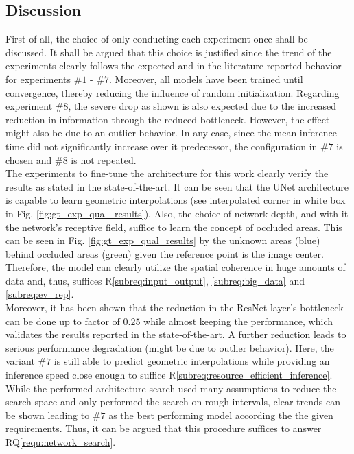 \subsection{Discussion}
\label{subsec:discussion_unet_arch}
First of all, the choice of only conducting each experiment once shall be discussed. It shall be argued that this choice is justified since the trend of the experiments clearly follows the expected and in the literature reported behavior for experiments $\#1$ - $\#7$. Moreover, all models have been trained until convergence, thereby reducing the influence of random initialization. Regarding experiment $\#8$, the severe drop as shown is also expected due to the increased reduction in information through the reduced bottleneck. However, the effect might also be due to an outlier behavior. In any case, since the mean inference time did not significantly increase over it predecessor, the configuration in $\#7$ is chosen and $\#8$ is not repeated.  
\\
The experiments to fine-tune the architecture for this work clearly verify the results as stated in the state-of-the-art. It can be seen that the UNet architecture is capable to learn geometric interpolations (see interpolated corner in white box in Fig. \ref{fig:gt_exp_qual_results}). Also, the choice of network depth, and with it the network's receptive field, suffice to learn the concept of occluded areas. This can be seen in Fig. \ref{fig:gt_exp_qual_results} by the unknown areas (blue) behind occluded areas (green) given the reference point is the image center. Therefore, the model can clearly utilize the spatial coherence in huge amounts of data and, thus, suffices R\ref{subreq:input_output}, \ref{subreq:big_data} and \ref{subreq:ev_rep}.
\\
Moreover, it has been shown that the reduction in the ResNet layer's bottleneck can be done up to factor of $0.25$ while almost keeping the performance, which validates the results reported in the state-of-the-art. A further reduction leads to serious performance degradation (might be due to outlier behavior). Here, the variant $\#7$ is still able to predict geometric interpolations while providing an inference speed close enough to suffice R\ref{subreq:resource_efficient_inference}.
\\
While the performed architecture search used many assumptions to reduce the search space and only performed the search on rough intervals, clear trends can be shown leading to $\#7$ as the best performing model according the the given requirements. Thus, it can be argued that this procedure suffices to answer RQ\ref{requ:network_search}.
%

